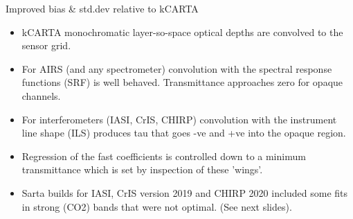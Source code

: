 \documentclass[10pt,t]{beamer}
\begin{document}
\begin{frame}{Improved bias \& std.dev relative to kCARTA}

  \begin{itemize}
  \item kCARTA monochromatic layer-so-space optical depths are convolved to the sensor grid.
  \item For AIRS (and any spectrometer) convolution with the spectral response functions (SRF) is well behaved. Transmittance approaches zero for opaque channels.
  \item For interferometers (IASI, CrIS, CHIRP) convolution with the instrument line shape (ILS) produces tau that goes -ve and +ve into the opaque region.
  \item Regression of the fast coefficients is controlled down to a minimum transmittance which is set by inspection of these 'wings'.
  \item Sarta builds for IASI, CrIS version 2019 and CHIRP 2020 included some fits in strong (CO2) bands that were not optimal. (See next slides).
  \end{itemize}

\end{frame}
\end{document}
